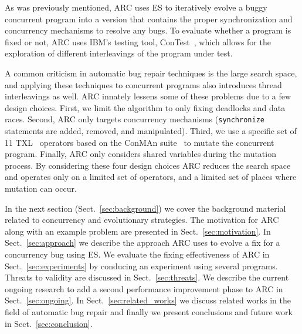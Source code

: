 As was previously mentioned, ARC uses ES to iteratively evolve a buggy concurrent program into a version that contains the proper synchronization and concurrency mechanisms to resolve any bugs. To evaluate
whether a program is fixed or not, ARC uses IBM's testing tool,
ConTest~\cite{EFN+02}, which allows for the exploration of different interleavings of
the program under test.

A common criticism in automatic bug repair techniques is the large search space, and applying these techniques to  concurrent programs also introduces thread interleavings as well.
ARC innately lessens some of these problems due to a few design choices. First,
we limit the algorithm to only fixing deadlocks and data races. Second, ARC
only targets concurrency mechanisms (\texttt{synchronize} statements are added,
removed, and manipulated). Third, we use a specific set of 11 TXL~\cite{CHP91}
operators based on the ConMAn suite~\cite{BCD06} to mutate the concurrent
program.  Finally, ARC only considers shared variables during the mutation
process. By considering these four design choices ARC reduces the search space and operates only on a limited set
of operators, and a limited set of places where mutation can occur.

In the next section (Sect.~\ref{sec:background}) we cover the background material related to concurrency and evolutionary strategies. The motivation for ARC along with an example
problem are presented in Sect.~\ref{sec:motivation}. In
Sect.~\ref{sec:approach} we describe the approach ARC uses to evolve a fix for
a concurrency bug using ES. We evaluate the fixing effectiveness of ARC in
Sect.~\ref{sec:experiments} by conducing an experiment using several programs.
Threats to validity are discussed in Sect.~\ref{sec:threats}. We describe the
current ongoing research to add a second performance improvement phase to ARC in Sect.~\ref{sec:ongoing}. In
Sect.~\ref{sec:related_works} we discuss related works in the field of
automatic bug repair and finally we present conclusions and future work in
Sect.~\ref{sec:conclusion}.



